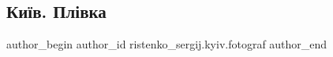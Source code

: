  
 
 
 
 

\subsection{Київ. Плівка}
\label{sec:22_06_2023.fb.ristenko_sergij.kyiv.fotograf.1.kyiv_plivka}

\ifcmt
 author_begin
   author_id ristenko_sergij.kyiv.fotograf
 author_end
\fi
